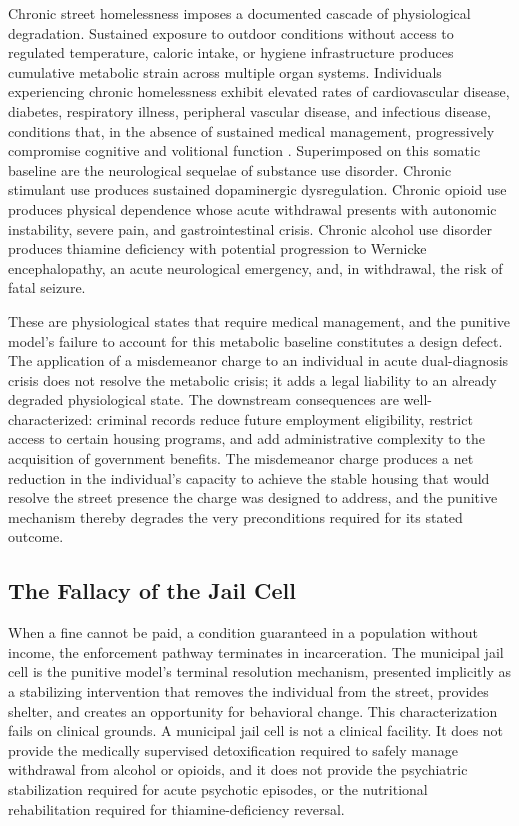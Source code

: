 \documentclass[12pt, letterpaper]{article}
\begin{document}
Chronic street homelessness imposes a documented cascade of physiological degradation. Sustained exposure to outdoor conditions without access to regulated temperature, caloric intake, or hygiene infrastructure produces cumulative metabolic strain across multiple organ systems. Individuals experiencing chronic homelessness exhibit elevated rates of cardiovascular disease, diabetes, respiratory illness, peripheral vascular disease, and infectious disease, conditions that, in the absence of sustained medical management, progressively compromise cognitive and volitional function \citep{dibella_wp1_2026}. Superimposed on this somatic baseline are the neurological sequelae of substance use disorder. Chronic stimulant use produces sustained dopaminergic dysregulation. Chronic opioid use produces physical dependence whose acute withdrawal presents with autonomic instability, severe pain, and gastrointestinal crisis. Chronic alcohol use disorder produces thiamine deficiency with potential progression to Wernicke encephalopathy, an acute neurological emergency, and, in withdrawal, the risk of fatal seizure.

These are physiological states that require medical management, and the punitive model's failure to account for this metabolic baseline constitutes a design defect. The application of a misdemeanor charge to an individual in acute dual-diagnosis crisis does not resolve the metabolic crisis; it adds a legal liability to an already degraded physiological state. The downstream consequences are well-characterized: criminal records reduce future employment eligibility, restrict access to certain housing programs, and add administrative complexity to the acquisition of government benefits. The misdemeanor charge produces a net reduction in the individual's capacity to achieve the stable housing that would resolve the street presence the charge was designed to address, and the punitive mechanism thereby degrades the very preconditions required for its stated outcome.

\subsection{The Fallacy of the Jail Cell}

When a fine cannot be paid, a condition guaranteed in a population without income, the enforcement pathway terminates in incarceration. The municipal jail cell is the punitive model's terminal resolution mechanism, presented implicitly as a stabilizing intervention that removes the individual from the street, provides shelter, and creates an opportunity for behavioral change. This characterization fails on clinical grounds. A municipal jail cell is not a clinical facility. It does not provide the medically supervised detoxification required to safely manage withdrawal from alcohol or opioids, and it does not provide the psychiatric stabilization required for acute psychotic episodes, or the nutritional rehabilitation required for thiamine-deficiency reversal.
\end{document}
